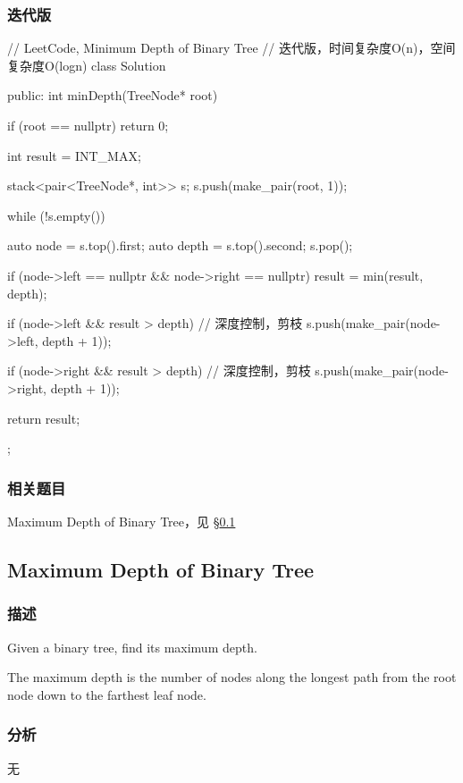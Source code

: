 \subsubsection{迭代版}
\begin{Code}
// LeetCode, Minimum Depth of Binary Tree
// 迭代版，时间复杂度O(n)，空间复杂度O(logn)
class Solution {
public:
    int minDepth(TreeNode* root) {
        if (root == nullptr)
            return 0;

        int result = INT_MAX;

        stack<pair<TreeNode*, int>> s;
        s.push(make_pair(root, 1));

        while (!s.empty()) {
            auto node = s.top().first;
            auto depth = s.top().second;
            s.pop();

            if (node->left == nullptr && node->right == nullptr)
                result = min(result, depth);

            if (node->left && result > depth) // 深度控制，剪枝
                s.push(make_pair(node->left, depth + 1));

            if (node->right && result > depth) // 深度控制，剪枝
                s.push(make_pair(node->right, depth + 1));
        }

        return result;
    }
};
\end{Code}

\subsubsection{相关题目}
\begindot
\item Maximum Depth of Binary Tree，见 \S \ref{sec:maximum-depth-of-binary-tree}
\myenddot


\subsection{Maximum Depth of Binary Tree}
\label{sec:maximum-depth-of-binary-tree}


\subsubsection{描述}
Given a binary tree, find its maximum depth.

The maximum depth is the number of nodes along the longest path from the root node down to the farthest leaf node.


\subsubsection{分析}
无

